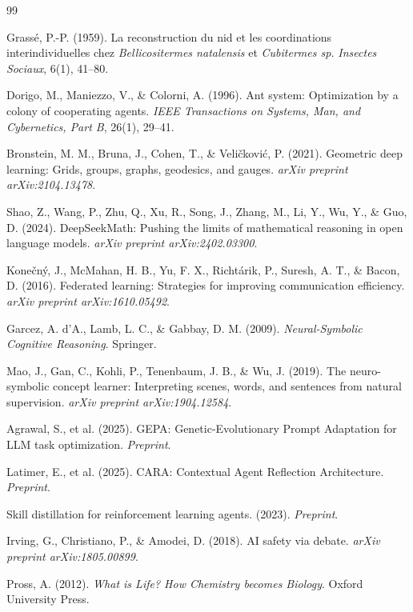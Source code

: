 \documentclass[11pt]{article}
\begin{document}
\begin{thebibliography}{99}

Grass\'e, P.-P. (1959).
La reconstruction du nid et les coordinations interindividuelles chez
\textit{Bellicositermes natalensis} et \textit{Cubitermes sp.}
\textit{Insectes Sociaux}, 6(1), 41--80.

Dorigo, M., Maniezzo, V., \& Colorni, A. (1996).
Ant system: Optimization by a colony of cooperating agents.
\textit{IEEE Transactions on Systems, Man, and Cybernetics, Part B}, 26(1), 29--41.

Bronstein, M. M., Bruna, J., Cohen, T., \& Veličković, P. (2021).
Geometric deep learning: Grids, groups, graphs, geodesics, and gauges.
\textit{arXiv preprint arXiv:2104.13478}.

Shao, Z., Wang, P., Zhu, Q., Xu, R., Song, J., Zhang, M., Li, Y., Wu, Y., \& Guo, D. (2024).
DeepSeekMath: Pushing the limits of mathematical reasoning in open language models.
\textit{arXiv preprint arXiv:2402.03300}.

Kone\v{c}n\'y, J., McMahan, H. B., Yu, F. X., Richt\'arik, P., Suresh, A. T., \& Bacon, D. (2016).
Federated learning: Strategies for improving communication efficiency.
\textit{arXiv preprint arXiv:1610.05492}.

Garcez, A. d'A., Lamb, L. C., \& Gabbay, D. M. (2009).
\textit{Neural-Symbolic Cognitive Reasoning}. Springer.

Mao, J., Gan, C., Kohli, P., Tenenbaum, J. B., \& Wu, J. (2019).
The neuro-symbolic concept learner: Interpreting scenes, words, and sentences
from natural supervision.
\textit{arXiv preprint arXiv:1904.12584}.

Agrawal, S., et al. (2025).
GEPA: Genetic-Evolutionary Prompt Adaptation for LLM task optimization.
\textit{Preprint}.

Latimer, E., et al. (2025).
CARA: Contextual Agent Reflection Architecture.
\textit{Preprint}.

Skill distillation for reinforcement learning agents. (2023).
\textit{Preprint}.

Irving, G., Christiano, P., \& Amodei, D. (2018).
AI safety via debate.
\textit{arXiv preprint arXiv:1805.00899}.

Pross, A. (2012).
\textit{What is Life? How Chemistry becomes Biology}. Oxford University Press.

\end{thebibliography}
\end{document}
